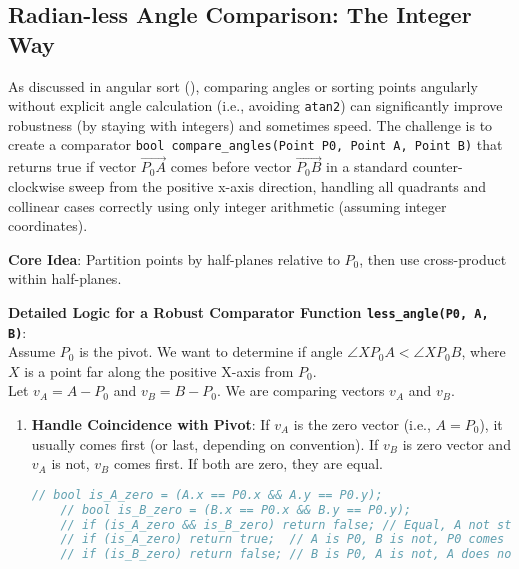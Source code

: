 \subsection{Radian-less Angle Comparison: The Integer Way}
\label{ssec:A.7.2}

\begin{openquestion}
\label{oq:A.7.2.radianless_compare}
As discussed in angular sort (), comparing angles or sorting points angularly without explicit angle calculation (i.e., avoiding \texttt{atan2}) can significantly improve robustness (by staying with integers) and sometimes speed.
The challenge is to create a comparator \texttt{bool compare\_angles(Point P0, Point A, Point B)} that returns true if vector $\vec{P_0A}$ comes before vector $\vec{P_0B}$ in a standard counter-clockwise sweep from the positive x-axis direction, handling all quadrants and collinear cases correctly using only integer arithmetic (assuming integer coordinates).

\textbf{Core Idea}: Partition points by half-planes relative to $P_0$, then use cross-product within half-planes.

\textbf{Detailed Logic for a Robust Comparator Function \texttt{less\_angle(P0, A, B)}}: \\
Assume $P_0$ is the pivot. We want to determine if angle $\angle X P_0 A < \angle X P_0 B$, where $X$ is a point far along the positive X-axis from $P_0$. \\
Let $v_A = A - P_0$ and $v_B = B - P_0$. We are comparing vectors $v_A$ and $v_B$.

\begin{enumerate}
    \item \textbf{Handle Coincidence with Pivot}: If $v_A$ is the zero vector (i.e., $A=P_0$), it usually comes first (or last, depending on convention). If $v_B$ is zero vector and $v_A$ is not, $v_B$ comes first. If both are zero, they are equal.
    \begin{lstlisting}[language=C++]
    // bool is_A_zero = (A.x == P0.x && A.y == P0.y);
    // bool is_B_zero = (B.x == P0.x && B.y == P0.y);
    // if (is_A_zero && is_B_zero) return false; // Equal, A not strictly less
    // if (is_A_zero) return true;  // A is P0, B is not, P0 comes first
    // if (is_B_zero) return false; // B is P0, A is not, A does not come first
    \end{lstlisting}


\end{enumerate}
\end{openquestion}
